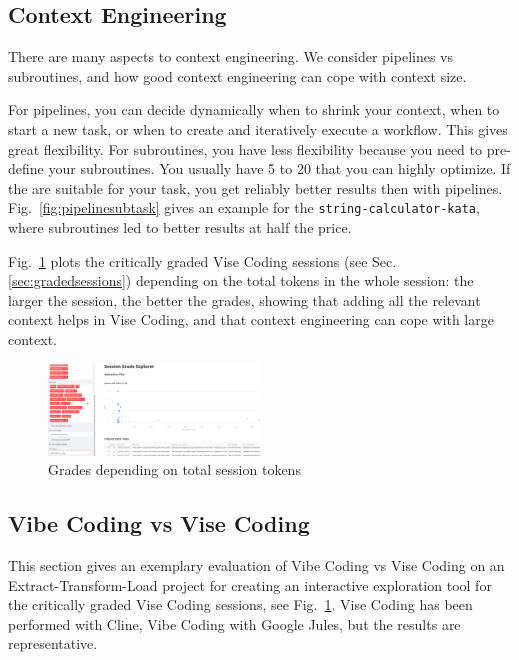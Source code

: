 \documentclass[twocolumn]{article}
\begin{document}
\subsection{Context Engineering}

There are many aspects to context engineering. We consider pipelines vs subroutines, and how good context engineering can cope with context size.

For pipelines, you can decide dynamically when to shrink your context, when to start a new task, or when to create and iteratively execute a workflow.
This gives great flexibility. For subroutines, you have less flexibility because you need to pre-define your subroutines. You usually have 5 to 20 that you can highly optimize. If the are suitable for your task, you get reliably better results then with pipelines. 
Fig.~\ref{fig:pipelinesubtask} gives an example for the \lstinline|string-calculator-kata|, where subroutines led to better results at half the price.

Fig.~\ref{fig:evaltool} plots the critically graded Vise Coding sessions (see Sec.\ref{sec:gradedsessions}) depending on the total tokens in the whole session:
the larger the session, the better the grades, showing that adding all the relevant context helps in Vise Coding, and that context engineering can cope with large context.

\begin{figure}[hbt!]
  \begin{center}
  \vspace{-2mm}
  \includegraphics[width=0.499\textwidth]{figures/session_grade_explorer_v1}
  \vspace{-7mm}
\caption{Grades depending on total session tokens}
\label{fig:evaltool}
\end{center}
\end{figure}

\subsection{Vibe Coding vs Vise Coding}

This section gives an exemplary evaluation of Vibe Coding vs Vise Coding on an Extract-Transform-Load project for creating an interactive exploration tool
for the critically graded Vise Coding sessions, see Fig.~\ref{fig:evaltool}. Vise Coding has been performed with Cline, Vibe Coding with Google Jules,
but the results are representative.
\end{document}
